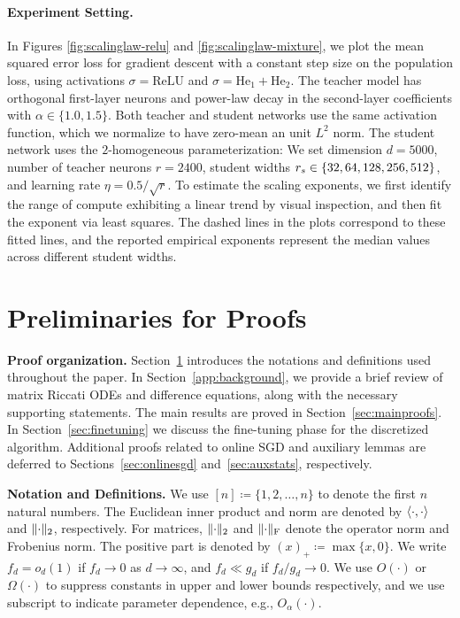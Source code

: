 \paragraph{Experiment Setting.}  In Figures \ref{fig:scalinglaw-relu}  and \ref{fig:scalinglaw-mixture}, we plot the mean squared error loss for gradient descent with a constant step size on the population loss, using activations $\sigma = \mathrm{ReLU}$ and $\sigma = \mathrm{He}_1 + \mathrm{He}_2$. The teacher model has orthogonal first-layer neurons and power-law decay in the second-layer coefficients with $\alpha \in \{1.0, 1.5\}$. Both teacher and student networks use the same activation function, which we normalize to have zero-mean an unit $L^2$ norm. The student network uses the $2$-homogeneous parameterization:
We set dimension $d = 5000$, number of teacher neurons $r = 2400$, student widths $r_s \in \{32, 64, 128, 256, 512\}$, and learning rate $\eta =  0.5/\sqrt{r}$.   To estimate the scaling exponents, we first identify the range of compute exhibiting a linear trend by visual inspection, and then fit the exponent via least squares. The dashed lines in the plots correspond to these fitted lines, and the reported empirical exponents represent the median values across different student widths. 

\bigskip


\section{Preliminaries for Proofs}
 \label{sect:prelimproof}
\smallskip

\textbf{Proof organization.}  Section~\ref{sect:prelimproof} introduces the notations and definitions used throughout the paper. In Section~\ref{app:background}, we provide a brief review of matrix Riccati ODEs and difference equations, along with the necessary supporting statements. The main results are proved in Section~\ref{sec:mainproofs}. In Section~\ref{sec:finetuning} we discuss the fine-tuning phase for the discretized algorithm. Additional proofs related to online SGD and auxiliary lemmas are deferred to Sections~\ref{sec:onlinesgd} and~\ref{sec:auxstats}, respectively.

\smallskip
\textbf{Notation and Definitions.}
We use $[n] \coloneqq \{1, 2, \ldots, n\}$ to denote the first $n$ natural numbers. The Euclidean inner product and norm are denoted by $\left \langle \cdot, \cdot \right \rangle$ and $\lVert\cdot\rVert_2$, respectively.  For matrices, $\lVert\cdot\rVert_2$ and $\lVert\cdot\rVert_\text{F}$ denote the operator norm and Frobenius norm.  The positive part is denoted by $(x)_+ \coloneqq \max\{x, 0\}$. We write $f_d = o_d(1)$ if $f_d \to 0$ as $d \to \infty$, and $f_d \ll g_d$ if $f_d/g_d \to 0$. We use $O(\cdot)$ or $\Omega(\cdot)$ to suppress constants in upper and lower bounds respectively, and we use subscript to indicate parameter dependence, e.g., $O_\alpha(\cdot)$.

